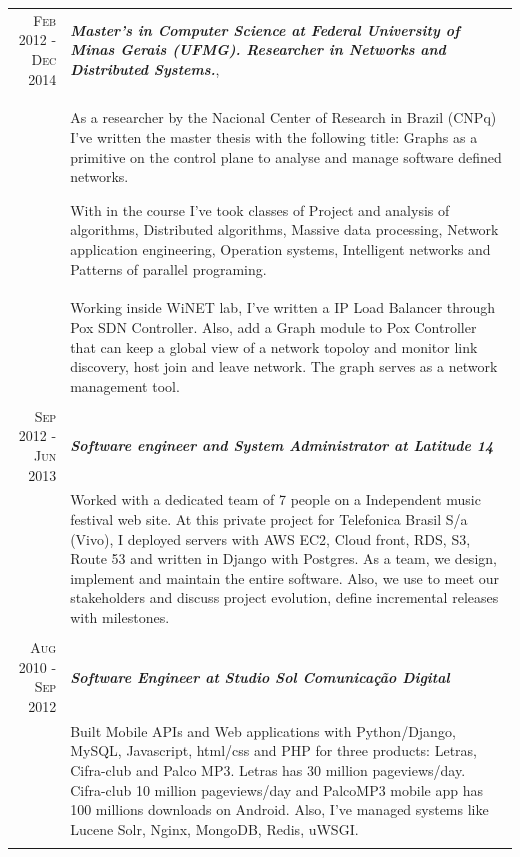 \documentclass[a4paper,10pt]{article} %
\begin{document}
\begin{longtable}{r|p{11cm}}

\textsc{Feb 2012 - Dec 2014} & \emph{\bf Master's in Computer Science at
Federal University of Minas Gerais (UFMG). Researcher in
Networks and Distributed Systems.}, \\
& \footnotesize{As a researcher by the Nacional Center of Research in Brazil
    (CNPq) I've written the master thesis with the following title: Graphs as
    a primitive on the control plane to analyse and manage software defined
    networks.

    With in the course I've took classes of Project and analysis of algorithms,
    Distributed algorithms, Massive data processing, Network application
    engineering, Operation systems, Intelligent networks and Patterns of
    parallel programing.} \\

& \footnotesize{
    Working inside WiNET lab, I've written a IP Load Balancer through Pox SDN
    Controller. Also, add a Graph module to
    Pox Controller that can keep a global view of a network topoloy and monitor
    link discovery, host join and leave network. The graph serves as a network
    management tool.} \\
\multicolumn{2}{c}{} \\


\textsc{Sep 2012 - Jun 2013} & \emph{\bf Software engineer and System
Administrator at Latitude 14} \\
& \footnotesize{Worked with a dedicated team of 7 people on a Independent
	music festival web site. At this private project for Telefonica Brasil
	S/a (Vivo), I deployed servers with AWS EC2, Cloud front, RDS, S3,
	Route 53 and written in Django with Postgres. As a team, we design,
	implement and maintain the entire software. Also, we use to meet our
	stakeholders and discuss project evolution, define incremental releases
	with milestones.} \\

\multicolumn{2}{c}{} \\


\pagebreak

\textsc{Aug 2010 - Sep 2012} & \emph{\bf Software Engineer at Studio Sol
Comunicação Digital}  \\
& \footnotesize{Built Mobile APIs and Web applications with Python/Django,
	MySQL, Javascript, html/css and PHP for three products: Letras, Cifra-club
	and Palco MP3. Letras has 30 million pageviews/day. Cifra-club 10 million
	pageviews/day and PalcoMP3 mobile app has 100 millions downloads on
	Android. Also, I've managed systems like Lucene Solr, Nginx, MongoDB,
	Redis, uWSGI.} \\
\multicolumn{2}{c}{} \\


\end{longtable}
\end{document}
